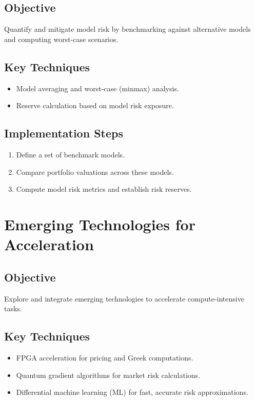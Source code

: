 \documentclass[11pt]{article}
\begin{document}
\subsection{Objective}
Quantify and mitigate model risk by benchmarking against alternative models and computing worst-case scenarios.

\subsection{Key Techniques}
\begin{itemize}
    \item Model averaging and worst-case (minmax) analysis.
    \item Reserve calculation based on model risk exposure.
\end{itemize}

\subsection{Implementation Steps}
\begin{enumerate}
    \item Define a set of benchmark models.
    \item Compare portfolio valuations across these models.
    \item Compute model risk metrics and establish risk reserves.
\end{enumerate}

\section{Emerging Technologies for Acceleration}
\subsection{Objective}
Explore and integrate emerging technologies to accelerate compute-intensive tasks.

\subsection{Key Techniques}
\begin{itemize}
    \item FPGA acceleration for pricing and Greek computations.
    \item Quantum gradient algorithms for market risk calculations.
    \item Differential machine learning (ML) for fast, accurate risk approximations.
\end{itemize}
\end{document}
